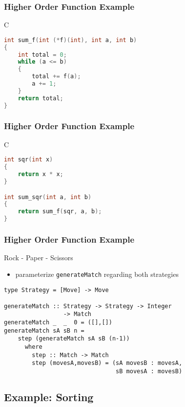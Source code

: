 \documentclass[dvipsnames]{beamer}
\theoremstyle{plain}
\begin{document}
\begin{frame}[fragile]
  \frametitle{Higher Order Function Example}

  \begin{exampleblock}{C}
    \begin{lstlisting}[language=c]
int sum_f(int (*f)(int), int a, int b)
{
    int total = 0;
    while (a <= b)
    {
        total += f(a);
        a += 1;
    }
    return total;
}
    \end{lstlisting}
  \end{exampleblock}
\end{frame}

\begin{frame}[fragile]
  \frametitle{Higher Order Function Example}

  \begin{exampleblock}{C}
    \begin{lstlisting}[language=c]
int sqr(int x)
{
    return x * x;
}

int sum_sqr(int a, int b)
{
    return sum_f(sqr, a, b);
}
    \end{lstlisting}
  \end{exampleblock}
\end{frame}

\begin{frame}[fragile]
  \frametitle{Higher Order Function Example}

  \begin{exampleblock}{Rock - Paper - Scissors}
    \begin{itemize}
      \item parameterize \lstinline{generateMatch} regarding both strategies
    \end{itemize}

    \begin{lstlisting}
type Strategy = [Move] -> Move

generateMatch :: Strategy -> Strategy -> Integer
                 -> Match
generateMatch _  _  0 = ([],[])
generateMatch sA sB n =
    step (generateMatch sA sB (n-1))
      where
        step :: Match -> Match
        step (movesA,movesB) = (sA movesB : movesA,
                                sB movesA : movesB)
    \end{lstlisting}
  \end{exampleblock}
\end{frame}

\subsection{Example: Sorting}
\end{document}
